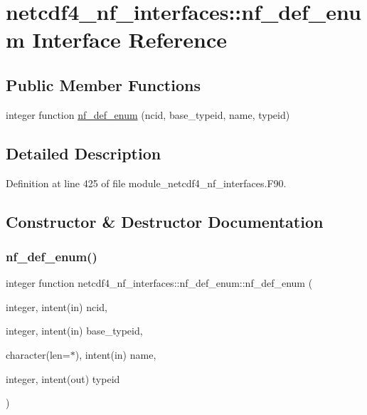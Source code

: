 \hypertarget{interfacenetcdf4__nf__interfaces_1_1nf__def__enum}{}\section{netcdf4\+\_\+nf\+\_\+interfaces\+:\+:nf\+\_\+def\+\_\+enum Interface Reference}
\label{interfacenetcdf4__nf__interfaces_1_1nf__def__enum}
\subsection*{Public Member Functions}
\begin{DoxyCompactItemize}
\item 
integer function \hyperlink{interfacenetcdf4__nf__interfaces_1_1nf__def__enum_ab42e0d24cc472db37f805f03229ca448}{nf\+\_\+def\+\_\+enum} (ncid, base\+\_\+typeid, name, typeid)
\end{DoxyCompactItemize}


\subsection{Detailed Description}


Definition at line 425 of file module\+\_\+netcdf4\+\_\+nf\+\_\+interfaces.\+F90.



\subsection{Constructor \& Destructor Documentation}
\mbox{\label{interfacenetcdf4__nf__interfaces_1_1nf__def__enum_ab42e0d24cc472db37f805f03229ca448}} 
\subsubsection{\texorpdfstring{nf\+\_\+def\+\_\+enum()}{nf\_def\_enum()}}
{\footnotesize\ttfamily integer function netcdf4\+\_\+nf\+\_\+interfaces\+::nf\+\_\+def\+\_\+enum\+::nf\+\_\+def\+\_\+enum (\begin{DoxyParamCaption}\item[{integer, intent(in)}]{ncid,  }\item[{integer, intent(in)}]{base\+\_\+typeid,  }\item[{character(len=$\ast$), intent(in)}]{name,  }\item[{integer, intent(out)}]{typeid }\end{DoxyParamCaption})}



